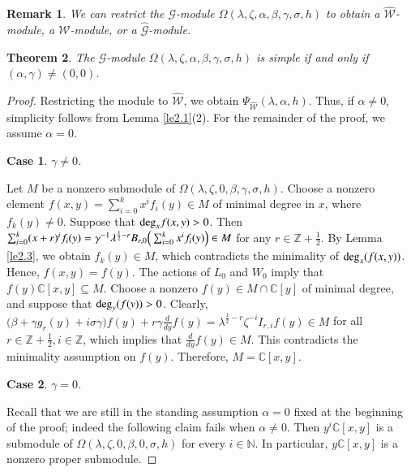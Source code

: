 \documentclass[12pt,reqno]{amsart}
\def\Z{\mathbb{Z}}
\def\N{\mathbb{N}}
\def\C{\mathbb{C}}
\numberwithin{equation}{section}
\newtheorem{theo}{Theorem}[section]
\newtheorem{case}{Case}
\newtheorem{rema}[theo]{Remark}
\begin{document}
\begin{rema}\label{rema3.3}
We can restrict the ${\mathcal{G}}$-module \(\Omega(\lambda,\zeta,\alpha,\beta,\gamma,\sigma,h)\) to obtain a \(\hat{\mathcal{W}}\)-module, a \(\mathcal{W}\)-module, or a \(\hat{\mathcal{G}}\)-module.
\end{rema}


\begin{theo}\label{theo 3.3}
    The $\mathcal{G}$-module $\Omega(\lambda,\zeta, \alpha,\beta,\gamma,\sigma,h)$ is simple if and only if $(\alpha, \gamma)\neq(0,0)$.
\end{theo}
\begin{proof} Restricting the module to $\hat{\mathcal W}$, we obtain $\Psi_{\hat{\mathcal{W}}}(\lambda,\alpha,h)$. Thus, 
if $\alpha\ne0$, simplicity follows from Lemma \ref{le2.1}(2).
    For the remainder of the proof, we assume $\alpha=0$. 

\begin{case}
    $\gamma\neq0$.
\end{case}
Let $M$ be a nonzero submodule of $\Omega(\lambda,\zeta, 0,\beta,\gamma,\sigma,h)$. Choose a nonzero element $f(x,y)=\sum_{i=0}^kx^if_i(y)\in M$ of minimal degree in $x$, where $f_{k}(y)\ne0$. Suppose that ${{\rm deg}_x}f(x,y)>0$. Then $\sum_{i=0}^k(x+r)^if_i(y)=\gamma^{-1}\lambda^{\frac{1}{2}-r}B_{r,0}\Big{(}\sum_{i=0}^kx^if_i(y)\Big{)}\in M$
for any $r\in\Z+\frac{1}{2}$. By Lemma \ref{le2.3}, we obtain $f_k(y)\in M$, which contradicts the minimality of ${\rm deg}_x(f(x,y))$. Hence, $f(x,y)=f(y)$. The actions of $L_{0}$ and $W_{0}$ imply that $f(y)\mathbb C[x,y]\subseteq M$. Choose a nonzero $f(y)\in M\cap\mathbb C[y]$ of minimal degree, and suppose that ${\rm deg}_y(f(y))>0$. Clearly, $\bigl(\beta +\gamma g_{r}(y)+i\sigma\gamma\bigl)f(y)+r\gamma\frac{d}{dy}f(y)=\lambda^{\frac{1}{2}-r}\zeta^{-i}I_{r,i}f(y)\in M$
for all $r\in\Z+\frac{1}{2},i\in\Z$, which implies that $\frac{d}{dy}f(y)\in M$. This contradicts the minimality assumption on $f(y)$. Therefore, $M=\C[x,y]$.



\begin{case}
    $\gamma=0$.
\end{case}
Recall that we are still in the standing assumption $\alpha=0$ fixed at the beginning of the proof; indeed the following claim fails when $\alpha\ne0$.
Then $y^i\C[x,y]$ is a submodule of $\Omega(\lambda,\zeta, 0,\beta,0,\sigma,h)$ for every $i\in\N$. In particular, $y\mathbb C[x,y]$ is a nonzero proper submodule.
\end{proof}
\end{document}
